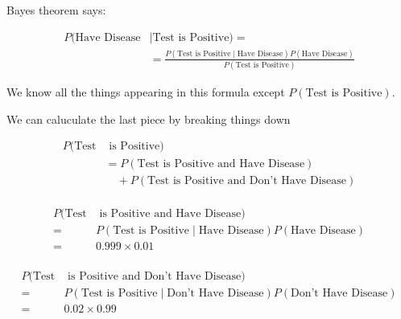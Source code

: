 %
\begin{frame}
Bayes theorem says:

\begin{align*}
P(\text{Have Disease}  & \mid \text{Test is Positive)} = \\
%
& = \frac{  P(\text{Test is
Positive} \mid \text{Have Disease}) P(\text{Have Disease}) } { P(\text{Test is
Positive}) }
\end{align*}

We know all the things appearing in this formula except $ P(\text{Test is
Positive}) $.

\end{frame}
%

%
\begin{frame}

We can caluculate the last piece by breaking things down

\begin{align*}
P(\text{Test} & \text{ is Positive}) \\
%
&= P(\text{Test is Positive and Have Disease}) \\
%
& \quad + P(\text{Test is Positive and Don't Have Disease}) \\
\end{align*}

\end{frame}
%

%
\begin{frame}

\begin{align*}
P(\text{Test} & \text{ is Positive and Have Disease}) \\
%
=& P(\text{Test is Positive} \mid \text{Have Disease}) P(\text{Have Disease}) \\
=& 0.999 \times 0.01 \\
\end{align*}

\end{frame}
%

%
\begin{frame}

\begin{align*}
P(\text{Test} & \text{ is Positive and Don't Have Disease}) \\
%
=& P(\text{Test is Positive} \mid \text{Don't Have Disease}) P(\text{Don't Have Disease}) \\
=& 0.02 \times 0.99 \\
\end{align*}

\end{frame}


